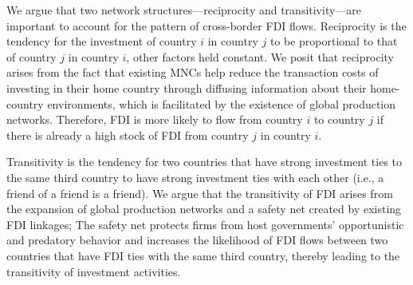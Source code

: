 \documentclass[reqno,onecolumn,letterpaper,12pt]{article}
\begin{document}

We argue that two network structures---reciprocity and transitivity---are important to account for the pattern of cross-border FDI flows. Reciprocity is the tendency for the investment of country $i$ in country $j$ to be proportional to that of country $j$ in country $i$, other factors held constant. We posit that reciprocity arises from the fact %
that existing MNCs help reduce the transaction costs of investing in their home country through diffusing information about their home-country environments, which is facilitated by the existence of global production networks. Therefore, FDI is more likely to flow from country $i$ to country $j$ if there is already a high stock of FDI from country $j$ in country $i$. %

Transitivity is the tendency for two countries that have strong investment ties to the same third country to have strong investment ties with each other (i.e., a friend of a friend is a friend). We argue that the transitivity of FDI arises from the expansion of global production networks and a safety net created by existing FDI linkages; The safety net protects firms from host governments' opportunistic and predatory behavior and increases the likelihood of FDI flows between two countries that have FDI ties with the same third country, thereby leading to the transitivity of investment activities. %
\end{document}
